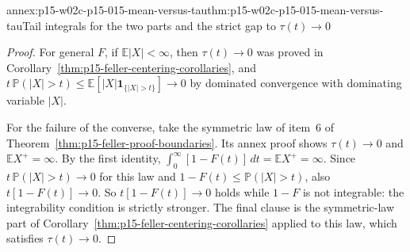 \begin{annexitem}{annex:p15-w02c-p15-015-mean-versus-tau}{thm:p15-w02c-p15-015-mean-versus-tau}{Tail integrals for the two parts and the strict gap to \(\tau(t)\to0\)}
\begin{proof}
For general \(F\), if \(\mathbb E|X|<\infty\), then
\(\tau(t)\to0\) was proved in
Corollary~\ref{thm:p15-feller-centering-corollaries}, and
\(t\,\mathbb P(|X|>t)\leq\mathbb E[|X|\mathbf1_{\{|X|>t\}}]\to0\) by
dominated convergence with dominating variable \(|X|\).

For the failure of the converse, take the symmetric law of item~6 of
Theorem~\ref{thm:p15-feller-proof-boundaries}. Its annex proof shows
\(\tau(t)\to0\) and \(\mathbb EX^+=\infty\). By the first identity,
\(\int_0^\infty[1-F(t)]\,dt=\mathbb EX^+=\infty\). Since
\(t\,\mathbb P(|X|>t)\to0\) for this law and
\(1-F(t)\leq\mathbb P(|X|>t)\), also \(t[1-F(t)]\to0\). So
\(t[1-F(t)]\to0\) holds while \(1-F\) is not integrable: the integrability
condition is strictly stronger. The final clause is the symmetric-law
part of Corollary~\ref{thm:p15-feller-centering-corollaries} applied to
this law, which satisfies \(\tau(t)\to0\).
\end{proof}
\end{annexitem}

